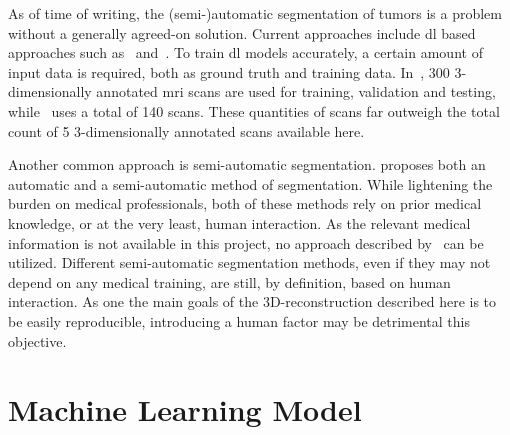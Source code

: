 As of time of writing, the (semi-)automatic segmentation of tumors is 
a problem without a generally agreed-on solution. Current approaches include
\ac{dl} based approaches such as~\cite{u-net_auto_anno} and~\cite{dl_rectal_segmentation}. 
To train \ac{dl} models accurately, a certain amount of input data is required, both as ground
truth and training data. In~\cite{u-net_auto_anno}, 300 3-dimensionally annotated \ac{mri} scans
are used for training, validation and testing, while~\cite{dl_rectal_segmentation} uses
a total of 140 scans. These quantities of scans far outweigh the total count of 5 3-dimensionally 
annotated scans available here.

Another common approach is semi-automatic segmentation. \cite{auto_and_semiauto} proposes 
both an automatic and a semi-automatic method of segmentation. While lightening the burden on
medical professionals, both of these methods rely on prior medical knowledge, or at the 
very least, human interaction. As the relevant medical information is not available in
this project, no approach described by~\cite{auto_and_semiauto} can be utilized.
Different semi-automatic segmentation methods, even if they may not depend on any medical
training, are still, by definition, based on human interaction. As one the main goals
of the 3D-reconstruction described here is to be easily reproducible, introducing a 
human factor may be detrimental this objective.





\section{Machine Learning Model}

